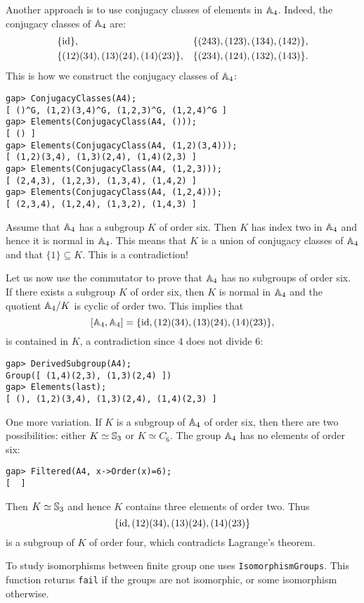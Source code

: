 \begin{example}
Another approach is to use conjugacy classes of elements in $\mathbb{A}_4$. Indeed, the conjugacy classes of $\mathbb{A}_4$ are:
\begin{align*}
	&\{\operatorname{id}\},
	&&\{(243), (123), (134), (142)\},\\
	&\{(12)(34),(13)(24),(14)(23)\},
	&&\{(234),(124), (132), (143)\}.
\end{align*}
This is how we construct the conjugacy classes of $\mathbb{A}_4$:
\begin{lstlisting}
gap> ConjugacyClasses(A4);
[ ()^G, (1,2)(3,4)^G, (1,2,3)^G, (1,2,4)^G ]
gap> Elements(ConjugacyClass(A4, ()));
[ () ]
gap> Elements(ConjugacyClass(A4, (1,2)(3,4)));
[ (1,2)(3,4), (1,3)(2,4), (1,4)(2,3) ]
gap> Elements(ConjugacyClass(A4, (1,2,3)));
[ (2,4,3), (1,2,3), (1,3,4), (1,4,2) ]
gap> Elements(ConjugacyClass(A4, (1,2,4)));
[ (2,3,4), (1,2,4), (1,3,2), (1,4,3) ]
\end{lstlisting}
Assume that $\mathbb{A}_4$ has a subgroup $K$ of order six. Then $K$ has index two in
$\mathbb{A}_4$ and hence it is normal in $\mathbb{A}_4$.  This means that $K$ is a union of
conjugacy classes of $\mathbb{A}_4$ and that $\{1\}\subseteq K$. This is a
contradiction!

Let us now use the commutator to prove that $\mathbb{A}_4$ has no subgroups of order
six.  If there exists a subgroup $K$ of order six, then $K$ is normal in
$\mathbb{A}_4$ and the quotient $\mathbb{A}_4/K$ is cyclic of order two.  This implies that 
\[
[\mathbb{A}_4,\mathbb{A}_4]=\{\operatorname{id},(12)(34),(13)(24),(14)(23)\},
\]
is contained in $K$, a contradiction since $4$ does not divide $6$: 
\begin{lstlisting}
gap> DerivedSubgroup(A4);
Group([ (1,4)(2,3), (1,3)(2,4) ])
gap> Elements(last);
[ (), (1,2)(3,4), (1,3)(2,4), (1,4)(2,3) ]
\end{lstlisting}

One more variation. If $K$ is a subgroup of $\mathbb{A}_4$ of order six, then there
are two possibilities: either $K\simeq\mathbb{S}_3$ or $K\simeq C_6$. The
group $\mathbb{A}_4$ has no elements of order six:
\begin{lstlisting}
gap> Filtered(A4, x->Order(x)=6);
[  ]
\end{lstlisting}
Then $K\simeq\mathbb{S}_3$ and hence $K$ contains three elements of order two.
Thus \[
	\{\operatorname{id},(12)(34),(13)(24),(14)(23)\}
\]
is a subgroup of $K$ of order four, which contradicts Lagrange's theorem.  
\end{example}

To study isomorphisms between finite group one uses
\lstinline{IsomorphismGroups}. This function returns \lstinline{fail} if the
groups are not isomorphic, or some isomorphism otherwise. 

